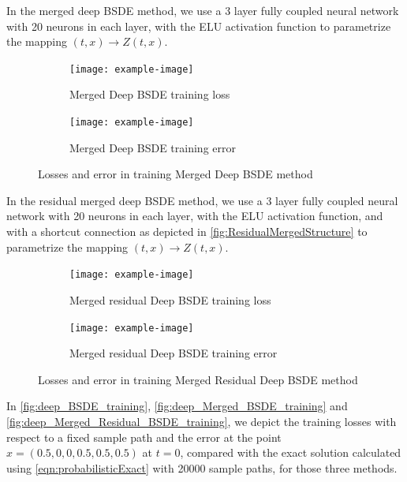 In the merged deep BSDE method, we use a 3 layer fully coupled neural network with 20 neurons in each layer, with the ELU activation function to parametrize the mapping $(t,x)\to Z(t,x)$. 

\begin{figure}[htb!]
	\begin{subfigure}{.475\linewidth}
		\texttt{[image: example-image]}
		\caption{Merged Deep BSDE training loss}
		\label{fig:Merged_loss}
	\end{subfigure}\hfill %
	\begin{subfigure}{.475\linewidth}
		\texttt{[image: example-image]}
		\caption{Merged Deep BSDE training error}
		\label{fig:Merged_error}
	\end{subfigure}
	\caption{Losses and error in training Merged Deep BSDE method }
	\label{fig:deep_Merged_BSDE_training}
\end{figure}

In the residual merged deep BSDE method, we use a 3 layer fully coupled neural network with 20 neurons in each layer, with the ELU activation function, and with a shortcut connection as depicted in \autoref{fig:ResidualMergedStructure} to parametrize the mapping $(t,x)\to Z(t,x)$. 

\begin{figure}[htb!]
	\begin{subfigure}{.475\linewidth}
		\texttt{[image: example-image]}
		\caption{Merged residual Deep BSDE training loss}
		\label{fig:Merged_residual_loss}
	\end{subfigure}\hfill %
	\begin{subfigure}{.475\linewidth}
		\texttt{[image: example-image]}
		\caption{Merged residual Deep BSDE training error}
		\label{fig:Merged_residual_error}
	\end{subfigure}
	\caption{Losses and error in training Merged Residual Deep BSDE method }
	\label{fig:deep_Merged_Residual_BSDE_training}
\end{figure}

In \autoref{fig:deep_BSDE_training}, \autoref{fig:deep_Merged_BSDE_training} and \autoref{fig:deep_Merged_Residual_BSDE_training}, we depict the training losses with respect to a fixed sample path and the error at the point $x=(0.5,0,0,0.5,0.5,0.5)$ at $t=0$, compared with the exact solution calculated using \eqref{eqn:probabilisticExact} with 20000 sample paths, for those three methods.

